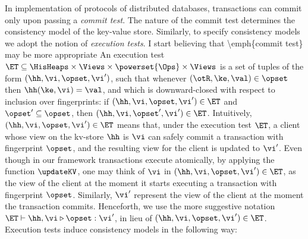 In implementation of protocols of distributed databases, transactions can 
commit only upon passing a \emph{commit test}. 
The nature of the commit test determines the consistency model of 
the key-value store.
Similarly, to specify consistency models we adopt the notion of 
\emph{execution tests}. 
\ac{I start believing that \emph{commit test} may be more appropriate}
An execution test 
$\ET \subseteq \HisHeaps \times \Views \times \powerset{\Ops} \times \Views$ 
is a set of tuples of the form $(\hh, \vi, \opset, \vi')$, such that 
whenever $(\otR, \ke, \val) \in \opset$ then $\hh(\ke, \vi) = \val$, and 
which is downward-closed with respect to inclusion over fingerprints: 
if $(\hh, \vi, \opset, \vi') \in \ET$ and $\opset' \subseteq \opset$, then 
$(\hh, \vi, \opset', \vi') \in \ET$.
Intuitively, 
$(\hh, \vi, \opset, \vi') \in \ET$ means that, under the execution test 
$\ET$, a client whose view on the kv-store $\hh$ is $\vi$ can safely 
commit a transaction with fingerprint $\opset$, and the resulting 
view for the client is updated to $\vi'$. 
Even though in our framework transactions execute atomically, by applying 
the function $\updateKV$, one may think of $\vi$ in $(\hh, \vi, \opset, \vi') \in \ET$, 
as the view of the client at the moment it starts executing a transaction with fingerprint 
$\opset$. Similarly, $\vi'$ represent the view of the client at the moment the transaction 
commits.
Henceforth, we use the more 
suggestive notation $\ET \vdash \hh, \vi \triangleright \opset : \vi'$, 
in lieu of $(\hh, \vi, \opset, \vi') \in \ET$.
Execution tests induce consistency models in the following way: 
